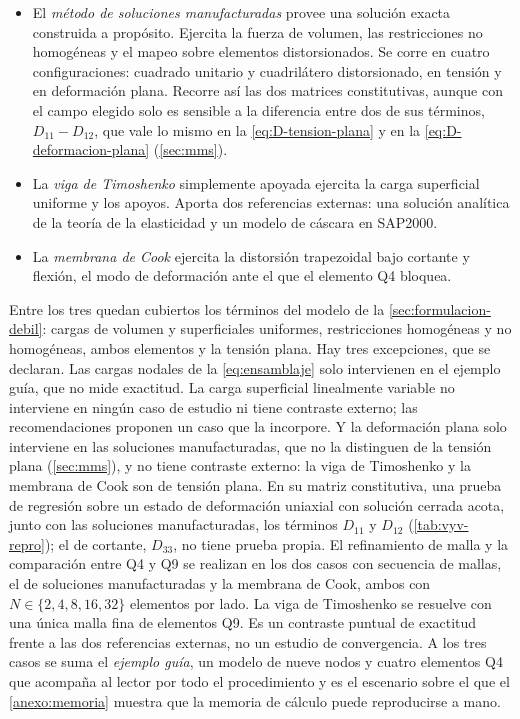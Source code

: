 \begin{itemize}
    \item El \emph{método de soluciones manufacturadas} provee una solución exacta construida a propósito. Ejercita la fuerza de volumen, las restricciones no homogéneas y el mapeo sobre elementos distorsionados. Se corre en cuatro configuraciones: cuadrado unitario y cuadrilátero distorsionado, en tensión y en deformación plana. Recorre así las dos matrices constitutivas, aunque con el campo elegido solo es sensible a la diferencia entre dos de sus términos, $D_{11}-D_{12}$, que vale lo mismo en la \autoref{eq:D-tension-plana} y en la \autoref{eq:D-deformacion-plana} (\autoref{sec:mms}).
    \item La \emph{viga de Timoshenko} simplemente apoyada ejercita la carga superficial uniforme y los apoyos. Aporta dos referencias externas: una solución analítica de la teoría de la elasticidad y un modelo de cáscara en SAP2000.
    \item La \emph{membrana de Cook} ejercita la distorsión trapezoidal bajo cortante y flexión, el modo de deformación ante el que el elemento Q4 bloquea.
\end{itemize}

Entre los tres quedan cubiertos los términos del modelo de la \autoref{sec:formulacion-debil}: cargas de volumen y superficiales uniformes, restricciones homogéneas y no homogéneas, ambos elementos y la tensión plana. Hay tres excepciones, que se declaran. Las cargas nodales de la \autoref{eq:ensamblaje} solo intervienen en el ejemplo guía, que no mide exactitud. La carga superficial linealmente variable no interviene en ningún caso de estudio ni tiene contraste externo; las recomendaciones proponen un caso que la incorpore. Y la deformación plana solo interviene en las soluciones manufacturadas, que no la distinguen de la tensión plana (\autoref{sec:mms}), y no tiene contraste externo: la viga de Timoshenko y la membrana de Cook son de tensión plana. En su matriz constitutiva, una prueba de regresión sobre un estado de deformación uniaxial con solución cerrada acota, junto con las soluciones manufacturadas, los términos $D_{11}$ y $D_{12}$ (\autoref{tab:vyv-repro}); el de cortante, $D_{33}$, no tiene prueba propia. El refinamiento de malla y la comparación entre Q4 y Q9 se realizan en los dos casos con secuencia de mallas, el de soluciones manufacturadas y la membrana de Cook, ambos con $N\in\{2,4,8,16,32\}$ elementos por lado. La viga de Timoshenko se resuelve con una única malla fina de elementos Q9. Es un contraste puntual de exactitud frente a las dos referencias externas, no un estudio de convergencia. A los tres casos se suma el \emph{ejemplo guía}, un modelo de nueve nodos y cuatro elementos Q4 que acompaña al lector por todo el procedimiento y es el escenario sobre el que el \autoref{anexo:memoria} muestra que la memoria de cálculo puede reproducirse a mano.


